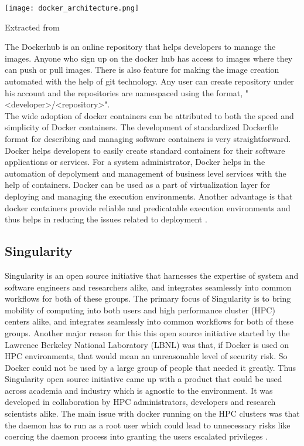 \begin{center}
\texttt{[image: docker\_architecture.png]}
\label{fig:docker_architecture}
\caption*{Extracted from \cite{docker-documentation}}
\end{center}

The Dockerhub is an online repository that helps developers to manage the images. Anyone who sign up on the docker hub has access to images where they can push or pull images. There is also feature for making the image creation automated with the help of git technology. Any user can create repository under his account and the repositories are namespaced using the format, "\textless developer\textgreater/\textless repository\textgreater"\cite{7742298}.\\

The wide adoption of docker containers can be attributed to both the speed and simplicity of Docker containers. The development of standardized Dockerfile format for describing and managing software containers is very straightforward. Docker helps developers to easily create standard containers for their software applications or services. For a system administrator, Docker helps in the automation of depolyment and management of business level services with the help of containers. Docker can be used as a part of virtualization layer for deploying and managing the execution environments. Another advantage is that docker containers provide reliable and predicatable execution environments and thus helps in reducing the issues related to deployment \cite{DBLP:journals/corr/MorrisVHM17}.

\subsection{Singularity}
Singularity is an open source initiative that harnesses the expertise of system and software engineers and researchers alike, and integrates seamlessly into common workflows for both of these groups. The primary focus of Singularity is to bring mobility of computing into both users and high performance cluster (HPC) centers alike, and integrates seamlessly into common workflows for both of these groups. Another major reason for this this open source initiative started by the Lawrence Berkeley National Laboratory (LBNL) was that, if Docker is used on HPC environments, that would mean an unreasonable level of security risk. So Docker could not be used by a large group of people that needed it greatly. Thus Singularity open source initiative came up with a product that could be used across academia and industry which is agnostic to the environment. It was developed in collaboration by HPC administrators, developers and research scientists alike. The main issue with docker running on the HPC clusters was that the daemon has to run as a root user which could lead to unnecessary risks like coercing the daemon process into granting the users escalated privileges \cite{10.1371/journal.pone.0177459}.\\

